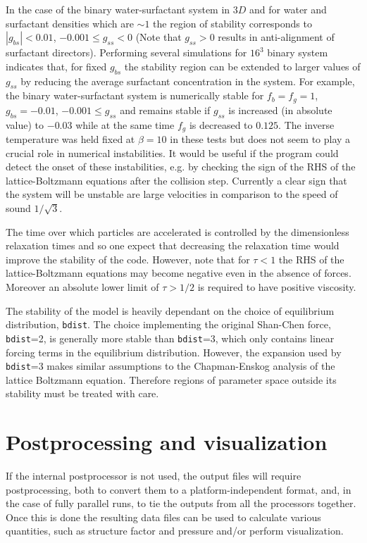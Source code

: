 \documentclass[a4paper]{article}
\begin{document}
In the case of the binary water-surfactant system in $3D$ and for water and
surfactant densities which are $\sim 1$ the region of stability corresponds to
$|g_{bs}|< 0.01$, $-0.001\leq g_{ss}<0$ (Note that $g_{ss}>0$  results in
anti-alignment of surfactant directors).  Performing several simulations for
$16^3$ binary system indicates that, for fixed $g_{bs}$ the stability region can
be extended to larger values of $g_{ss}$ by reducing the average surfactant
concentration in the system. For example, the binary water-surfactant system is
numerically stable for $f_b=f_g=1$, $g_{bs}=-0.01$, $-0.001 \leq g_{ss}$ and
remains stable if $g_{ss}$ is increased (in absolute value) to $-0.03$ while at
the same time $f_g$ is decreased to $0.125$.  The inverse temperature was held
fixed at $\beta=10$ in these tests but does not seem to play a crucial role in
numerical instabilities.  It would be useful if the program could detect the
onset of these instabilities, e.g. by checking the sign of the RHS of the
lattice-Boltzmann equations after the collision step. Currently a clear sign
that the system will be unstable are large velocities in comparison to the speed
of sound $1/\sqrt{3}$.

The time over which particles are accelerated is controlled by the dimensionless
relaxation times and so one expect that decreasing the relaxation time would
improve the stability of the code. However, note that for $\tau<1$ the RHS of
the lattice-Boltzmann equations may become negative even in the absence of
forces. Moreover an absolute lower limit of $\tau>1/2$ is required to have
positive viscosity. 

The stability of the model is heavily dependant on the choice of equilibrium
distribution, {\tt bdist}. The choice implementing the original Shan-Chen force,
{\tt bdist}=2, is generally more stable than {\tt bdist}=3, which only contains
linear forcing terms in the equilibrium distribution. However, the expansion
used by {\tt bdist}=3 makes similar assumptions to the Chapman-Enskog analysis
of the lattice Boltzmann equation. Therefore regions of parameter space outside
its stability must be treated with care.

\section{Postprocessing and visualization}

If the internal postprocessor is not used, the output files will require
postprocessing, both to convert them to a platform-independent format, and, in
the case of fully parallel runs, to tie the outputs from all the processors
together. Once this is done the resulting data files can be used to calculate
various quantities, such as structure factor and pressure and/or perform
visualization.
\end{document}
